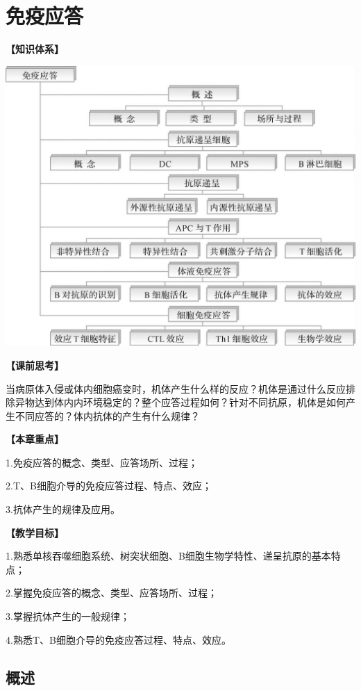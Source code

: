 \chapter{免疫应答}
\begin{framed}
\noindent\textbf{【知识体系】}
\begin{center}
\includegraphics{./images/Image00126.jpg}
\end{center}
\noindent\textbf{【课前思考】}

当病原体入侵或体内细胞癌变时，机体产生什么样的反应？机体是通过什么反应排除异物达到体内内环境稳定的？整个应答过程如何？针对不同抗原，机体是如何产生不同应答的？体内抗体的产生有什么规律？

\noindent\textbf{【本章重点】}

1.免疫应答的概念、类型、应答场所、过程；

2.T、B细胞介导的免疫应答过程、特点、效应；

3.抗体产生的规律及应用。

\noindent\textbf{【教学目标】}

1.熟悉单核吞噬细胞系统、树突状细胞、B细胞生物学特性、递呈抗原的基本特点；

2.掌握免疫应答的概念、类型、应答场所、过程；

3.掌握抗体产生的一般规律；

4.熟悉T、B细胞介导的免疫应答过程、特点、效应。
\end{framed}

\section{概述}


